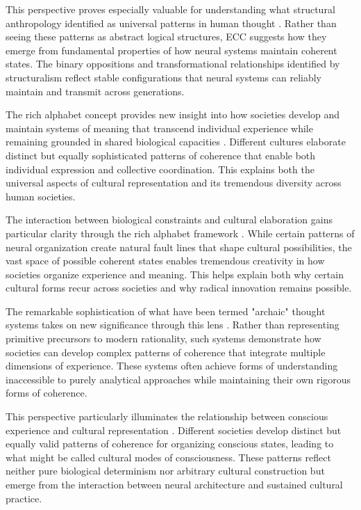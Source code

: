 \begin{refsection}
This perspective proves especially valuable for understanding what structural anthropology identified as universal patterns in human thought \cite{levistrauss1963structural}. Rather than seeing these patterns as abstract logical structures, ECC suggests how they emerge from fundamental properties of how neural systems maintain coherent states. The binary oppositions and transformational relationships identified by structuralism reflect stable configurations that neural systems can reliably maintain and transmit across generations.

The rich alphabet concept provides new insight into how societies develop and maintain systems of meaning that transcend individual experience while remaining grounded in shared biological capacities \cite{rappaport1999ritual}. Different cultures elaborate distinct but equally sophisticated patterns of coherence that enable both individual expression and collective coordination. This explains both the universal aspects of cultural representation and its tremendous diversity across human societies.

The interaction between biological constraints and cultural elaboration gains particular clarity through the rich alphabet framework \cite{descola2013beyond}. While certain patterns of neural organization create natural fault lines that shape cultural possibilities, the vast space of possible coherent states enables tremendous creativity in how societies organize experience and meaning. This helps explain both why certain cultural forms recur across societies and why radical innovation remains possible.

The remarkable sophistication of what have been termed "archaic" thought systems takes on new significance through this lens \cite{turner1967forest}. Rather than representing primitive precursors to modern rationality, such systems demonstrate how societies can develop complex patterns of coherence that integrate multiple dimensions of experience. These systems often achieve forms of understanding inaccessible to purely analytical approaches while maintaining their own rigorous forms of coherence.

This perspective particularly illuminates the relationship between conscious experience and cultural representation \cite{jung1968archetypes}. Different societies develop distinct but equally valid patterns of coherence for organizing conscious states, leading to what might be called cultural modes of consciousness. These patterns reflect neither pure biological determinism nor arbitrary cultural construction but emerge from the interaction between neural architecture and sustained cultural practice.


\end{refsection}
